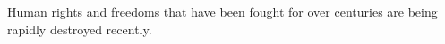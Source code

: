Human rights and freedoms that have been fought for over centuries are being rapidly destroyed recently.